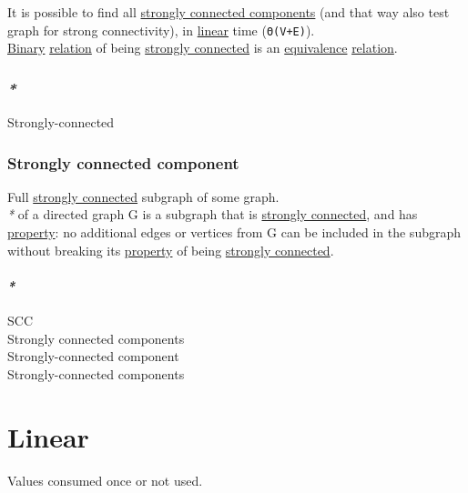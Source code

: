 \documentclass[a4paper,14pt,oneside]{book}
\begin{document}
It is possible to find all \hyperref[orgcd9c6e4]{strongly connected components} (and that way also test graph for strong connectivity), in \hyperref[org1762823]{linear} time (\texttt{Θ(V+E)}).\\

\hyperref[orga442c45]{Binary} \hyperref[org6396c35]{relation} of being \hyperref[org5261fe7]{strongly connected} is an \hyperref[org884f16c]{equivalence} \hyperref[org6396c35]{relation}.\\

\subsection{\emph{*}}
\label{sec:org7c9c058}

\label{orga1175e2}Strongly-connected\\

\subsection{\label{orge568963}Strongly connected component}
\label{sec:org704414a}
Full \hyperref[org5261fe7]{strongly connected} subgraph of some graph.\\

\emph{*} of a directed graph G is a subgraph that is \hyperref[org5261fe7]{strongly connected}, and has \hyperref[org49b84ac]{property}: no additional edges or vertices from G can be included in the subgraph without breaking its \hyperref[org49b84ac]{property} of being \hyperref[org5261fe7]{strongly connected}.\\

\subsubsection{\emph{*}}
\label{sec:orgfcbfb4e}

\label{orgaa84100}SCC\\
\label{orgcd9c6e4}Strongly connected components\\
\label{orge622021}Strongly-connected component\\
\label{orgfddf4c1}Strongly-connected components\\

\chapter{\label{org1762823}Linear}
\label{sec:org21f28f9}
Values consumed once or not used.\\
\end{document}
